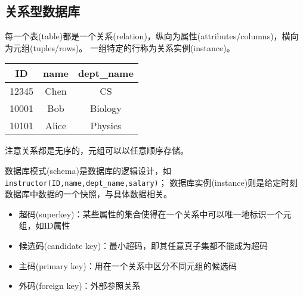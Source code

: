 \subsection{关系型数据库}
每一个表(table)都是一个关系(relation)，纵向为属性(attributes/columns)，横向为元组(tuples/rows)。
一组特定的行称为关系实例(instance)。
\begin{center}
\begin{tabular}{|c|c|c|}\hline
ID & name & dept\_name\\\hline
12345 & Chen & CS\\
10001 & Bob & Biology\\
10101 & Alice & Physics\\\hline
\end{tabular}
\end{center}
注意关系都是无序的，元组可以以任意顺序存储。

数据库模式(schema)是数据库的逻辑设计，如\verb'instructor(ID,name,dept_name,salary)'；
数据库实例(instance)则是给定时刻数据库中数据的一个快照，与具体数据相关。

\begin{itemize}
\item 超码(superkey)：某些属性的集合使得在一个关系中可以唯一地标识一个元组，如ID属性
\item 候选码(candidate key)：最小超码，即其任意真子集都不能成为超码
\item 主码(primary key)：用在一个关系中区分不同元组的候选码
\item 外码(foreign key)：外部参照关系
\end{itemize}